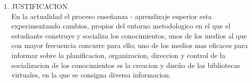 \begin{enumerate}[1.]
\item JUSTIFICACION 
	\\ En la actualidad el proceso enseñanza - aprendizaje superior esta experimentando cambios, propios del entorno metodologico en el que el estudiante construye y socializa los conocimientos, unos de los medios al que con mayor frecuencia concurre para ello; uno de los medios mas eficaces para informar sobre la planificacion, organizacion, direccion y control de la socializacion de los conocimientos es la creacion y diseño de las bibliotecas virtuales, en la que se consigna diversa informacion.
	

\end{enumerate} 
